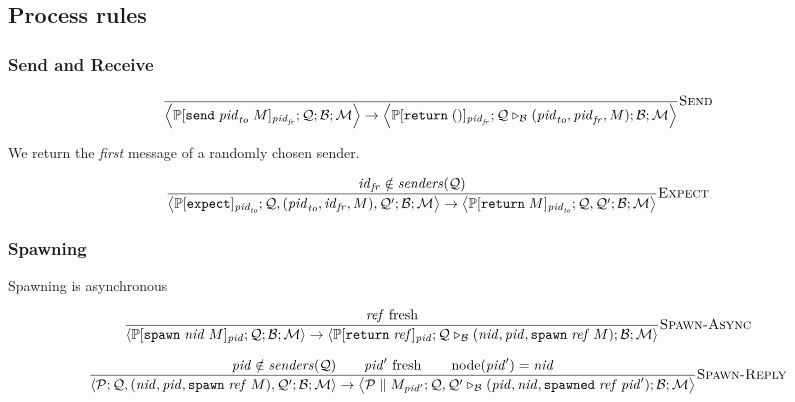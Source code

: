 \documentclass{article}
\newcommand{\sReturn}{\mathtt{return}}
\newcommand{\sExpect}{\mathtt{expect}}
\newcommand{\sSend}{\mathtt{send}}
\newcommand{\sSpawn}{\mathtt{spawn}}
\DeclareMathOperator{\sNodeOf}{node}
\newcommand{\sSpawned}{\mathtt{spawned}}
\newcommand{\sExtend}[1]{\mathrel{\triangleright_{#1}}}
\newcommand{\sPar}{\mathrel{\parallel}}
\newcommand{\sNid}{\ensuremath{\mathit{nid}}}
\newcommand{\sPid}{\ensuremath{\mathit{pid}}}
\newcommand{\sId}{\ensuremath{\mathit{id}}}
\newcommand{\sRef}{\ensuremath{\mathit{ref}}}
\newcommand{\sSystem}[4]{\left\langle #1 ; #2 ; #3 ; #4 \right\rangle}
\newcommand{\sQueue}{\mathcal{Q}}
\newcommand{\sProcesses}{\mathcal{P}}
\newcommand{\sBlacklist}{\mathcal{B}}
\newcommand{\sMonitors}{\mathcal{M}}
\newcommand{\sCtxt}[1]{\mathbb{#1}}
\newcommand{\sSenders}{\mathit{senders}}
\begin{document}
\subsection{Process rules}

\subsubsection{Send and Receive}

\begin{equation*}
\frac{
}{
  \sSystem{\sCtxt{P}[ \sSend \; \sPid_\mathit{to} \; M ]_{\sPid_\mathit{fr}}}
          {\sQueue}
          {\sBlacklist}
          {\sMonitors}
\rightarrow 
  \sSystem{\sCtxt{P}[ \sReturn \; () ]_{\sPid_\mathit{fr}}}
          {\sQueue \sExtend{\sBlacklist} (\sPid_\mathit{to}, \sPid_\mathit{fr}, M)}
          {\sBlacklist}
          {\sMonitors}
} \textsc{Send}
\end{equation*}

We return the \emph{first} message of a randomly chosen sender.

\begin{equation*}
\frac{
  \sId_{\mathit{fr}} \notin \sSenders(\sQueue)
}{
  \sSystem{\sCtxt{P}[ \sExpect ]_{\sPid_\mathit{to}}}
          {\sQueue, (\sPid_\mathit{to}, \sId_\mathit{fr}, M), \sQueue'}
          {\sBlacklist}
          {\sMonitors}
\rightarrow
  \sSystem{\sCtxt{P}[ \sReturn \; M ]_{\sPid_\mathit{to}}}
          {\sQueue, \sQueue'}
          {\sBlacklist}
          {\sMonitors}
} \textsc{Expect}
\end{equation*}

\subsubsection{Spawning}

Spawning is asynchronous

\begin{equation*}
\frac{
  \sRef \text{ fresh} 
}{
  \sSystem{\sCtxt{P}[ \sSpawn \; \sNid \; M ]_\sPid}
          {\sQueue}
          {\sBlacklist}
          {\sMonitors}
\rightarrow          
  \sSystem{\sCtxt{P}[ \sReturn \; \sRef ]_\sPid}
          {\sQueue \sExtend{\sBlacklist} (\sNid, \sPid, \sSpawn \; \sRef \; M)}
          {\sBlacklist}
          {\sMonitors}
} \textsc{Spawn-Async}
\end{equation*}

\begin{equation*}
\frac{
  \sPid \notin \sSenders(\sQueue)
\qquad
  \sPid' \text{ fresh} 
\qquad
  \sNodeOf(\sPid') = \sNid
}{
  \sSystem{\sProcesses}
          {\sQueue, (\sNid, \sPid, \sSpawn \; \sRef \; M), \sQueue'}
          {\sBlacklist}
          {\sMonitors}
\rightarrow
  \sSystem{\sProcesses \sPar M_{\sPid'}}
          {\sQueue, \sQueue' \sExtend{\sBlacklist} (\sPid, \sNid, \sSpawned \; \sRef \; \sPid')}
          {\sBlacklist}
          {\sMonitors}
} \textsc{Spawn-Reply}
\end{equation*}
\end{document}
